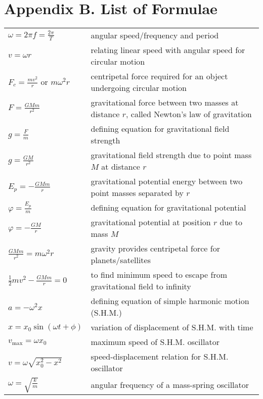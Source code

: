 \section*{Appendix B. List of Formulae}

\vspace*{-2em}
{
{
	\scriptsize

\begin{longtable}{p{} p{}}
	$\omega=2\pi f = \frac{2\pi}{T}$ & angular speed/frequency and period \\
	$v=\omega r$ & relating linear speed with angular speed  for circular motion\\ 
	$F_c=\frac{mv^2}{r} \text{ or } m\omega^2r$ & centripetal force required for an object undergoing circular motion\\
	$F=\frac{GMm}{r^2}$ & gravitational force between two masses at distance $r$, called Newton's law of gravitation \\
	$g=\frac{F}{m}$ & defining equation for gravitational field strength \\
	$g=\frac{GM}{r^2}$ & gravitational field strength due to point mass $M$ at distance $r$\\
	$E_p=-\frac{GMm}{r}$ & gravitational potential energy between two point masses separated by $r$ \\
	$\varphi=\frac{E_p}{m}$ & defining equation for gravitational potential \\
	$\varphi =-\frac{GM}{r}$ & gravitational potential at position $r$ due to mass $M$ \\
	$\frac{GMm}{r^2} = m\omega^2 r$ & gravity provides centripetal force for planets/satellites \\
	$\frac{1}{2}mv^2 - \frac{GMm}{r} = 0$ & to find minimum speed to escape from gravitational field to infinity \\
	$a=-\omega^2x$ & defining equation of simple harmonic motion (S.H.M.)\\
	$x=x_0\sin(\omega t+\phi)$ & variation of displacement of S.H.M. with time\\
	$v_\text{max}=\omega x_0$ & maximum speed of S.H.M. oscillator \\
	$v=\omega\sqrt{x_0^2-x^2}$ & speed-displacement relation for S.H.M. oscillator \\
	$\omega=\sqrt{\frac{k}{m}}$ & angular frequency of a mass-spring oscillator \\

\end{longtable}}}
